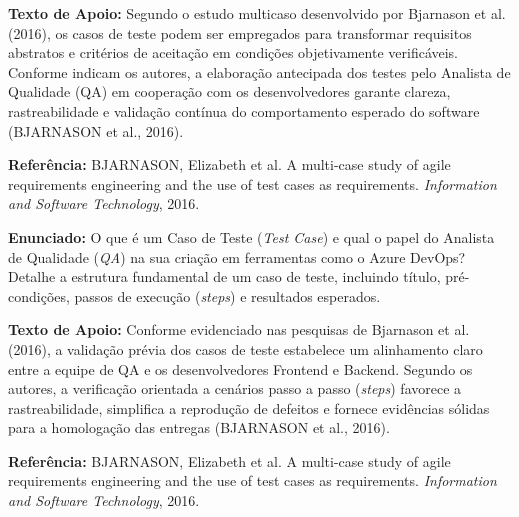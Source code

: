 \documentclass[12pt]{article}
\begin{document}
\begin{textoApoio}
\small
\textbf{Texto de Apoio:} Segundo o estudo multicaso desenvolvido por Bjarnason et al. (2016), os casos de teste podem ser empregados para transformar requisitos abstratos e critérios de aceitação em condições objetivamente verificáveis. Conforme indicam os autores, a elaboração antecipada dos testes pelo Analista de Qualidade (QA) em cooperação com os desenvolvedores garante clareza, rastreabilidade e validação contínua do comportamento esperado do software (BJARNASON et al., 2016).

\vspace{0.15cm}
\noindent\textbf{Referência:} BJARNASON, Elizabeth et al. A multi-case study of agile requirements engineering and the use of test cases as requirements. \textit{Information and Software Technology}, 2016.
\end{textoApoio}

\vspace{0.15cm}
\noindent\textbf{Enunciado:} O que é um Caso de Teste (\textit{Test Case}) e qual o papel do Analista de Qualidade (\textit{QA}) na sua criação em ferramentas como o Azure DevOps? Detalhe a estrutura fundamental de um caso de teste, incluindo título, pré-condições, passos de execução (\textit{steps}) e resultados esperados.

\vspace{0.2cm}
\begin{caixaResposta}
\end{caixaResposta}

\vspace{0.6cm}

\vspace{0.15cm}

\begin{textoApoio}
\small
\textbf{Texto de Apoio:} Conforme evidenciado nas pesquisas de Bjarnason et al. (2016), a validação prévia dos casos de teste estabelece um alinhamento claro entre a equipe de QA e os desenvolvedores Frontend e Backend. Segundo os autores, a verificação orientada a cenários passo a passo (\textit{steps}) favorece a rastreabilidade, simplifica a reprodução de defeitos e fornece evidências sólidas para a homologação das entregas (BJARNASON et al., 2016).

\vspace{0.15cm}
\noindent\textbf{Referência:} BJARNASON, Elizabeth et al. A multi-case study of agile requirements engineering and the use of test cases as requirements. \textit{Information and Software Technology}, 2016.
\end{textoApoio}
\end{document}
